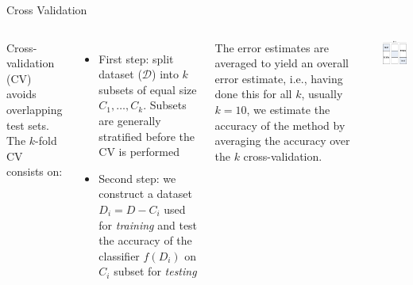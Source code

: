 \documentclass{beamer}
\begin{document}
\begin{frame}[shrink]{Cross Validation}

\begin{columns}
 
\alert{Cross-validation} (CV) avoids overlapping test sets. The $k$-fold CV consists on:
\begin{itemize}
 \item First step: split dataset ($\mathcal{D}$) into $k$ subsets of equal size $C_1,\ldots,C_k$. Subsets are generally stratified before the CV is performed

 \item Second step: we construct a dataset $D_i = D-C_i$ used for \emph{training} and test the accuracy of the classifier $f(D_i)$ on $C_i$ subset for \textit{testing}
 
\end{itemize}

The error estimates are averaged to yield an overall error estimate, i.e., having done this for all $k$, usually $k=10$, we estimate the accuracy of the method by averaging the accuracy over the $k$ cross-validation.

\begin{center}
\includegraphics[width=\textwidth]{figs/crossValidation}
\end{center}

\end{columns}

\end{frame}
\end{document}
